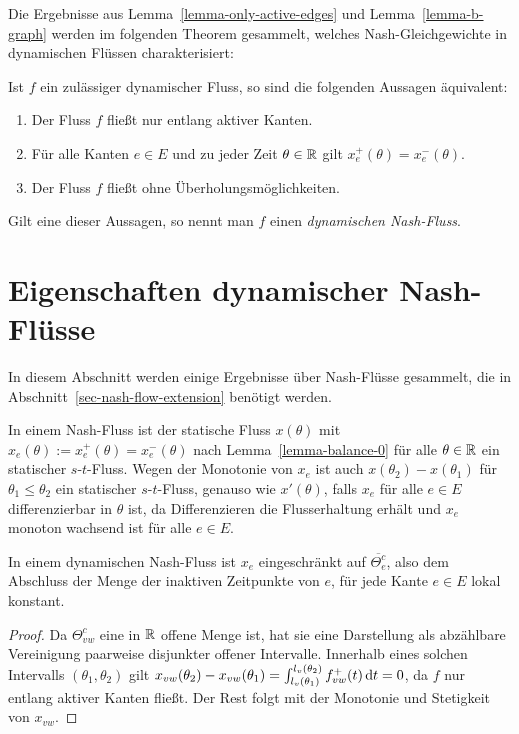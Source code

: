 Die Ergebnisse aus Lemma~\ref{lemma-only-active-edges} und Lemma~\ref{lemma-b-graph} werden im folgenden Theorem gesammelt, welches Nash-Gleichgewichte in dynamischen Flüssen charakterisiert:

\begin{theorem}\label{thm-equivalencies-nash-flow}
	Ist $f$ ein zu\-läs\-siger dynamischer Fluss, so sind die folgenden Aussagen äquivalent:
	\begin{enumerate}[label=(\roman*)]
		\item Der Fluss $f$ fließt nur entlang aktiver Kanten.
		\item Für alle Kanten $e\in E$ und zu jeder Zeit $\theta\in\mathbb{R}$ gilt $x_e^+(\theta) = x_e^-(\theta)$.
		\item Der Fluss $f$ fließt ohne Überholungsmöglichkeiten.
	\end{enumerate}
	Gilt eine dieser Aussagen, so nennt man $f$ einen \emph{dynamischen Nash-Fluss}.
\end{theorem}

\section{Eigenschaften dynamischer Nash-Flüsse}

In diesem Abschnitt werden einige Ergebnisse über Nash-Flüsse gesammelt, die in Abschnitt~\ref{sec-nash-flow-extension} benötigt werden.

\begin{remark}\label{remark-s-t-flow}
	In einem Nash-Fluss ist der statische Fluss $x(\theta)$ mit $x_e(\theta):=x_e^+(\theta)=x_e^-(\theta)$ nach Lemma~\ref{lemma-balance-0} für alle $\theta\in\mathbb{R}$  ein statischer $s$-$t$-Fluss.
	Wegen der Monotonie von $x_e$ ist auch $x(\theta_2) - x(\theta_1)$ für $\theta_1 \leq \theta_2$ ein statischer $s$-$t$-Fluss, genauso wie $x'(\theta)$, falls $x_e$ für alle $e\in E$ differenzierbar in $\theta$ ist, da Differenzieren die Flusserhaltung erhält und $x_e$ monoton wachsend ist für alle $e\in E$.
\end{remark}

\begin{lemma}\label{lemma-x-locally-constant}
In einem dynamischen Nash-Fluss ist $x_e$ eingeschränkt auf $\overline{\Theta_e^c}$, also dem Abschluss der Menge der inaktiven Zeitpunkte von $e$, für jede Kante $e\in E$ lokal konstant.
\end{lemma}
\begin{proof}
Da $\Theta_{vw}^c$ eine in $\mathbb{R}$ offene Menge ist, hat sie eine Darstellung als abzählbare Vereinigung paarweise disjunkter offener Intervalle.
Innerhalb eines solchen Intervalls $(\theta_1, \theta_2)$ gilt $x_{vw}(\theta_2) - x_{vw}(\theta_1) = \int_{l_v(\theta_1)}^{l_v(\theta_2)} f_{vw}^+(t) \mathop{}\!\mathrm{d} t = 0$, da $f$ nur entlang aktiver Kanten fließt.
Der Rest folgt mit der Monotonie und Stetigkeit von $x_{vw}$.
\end{proof}

